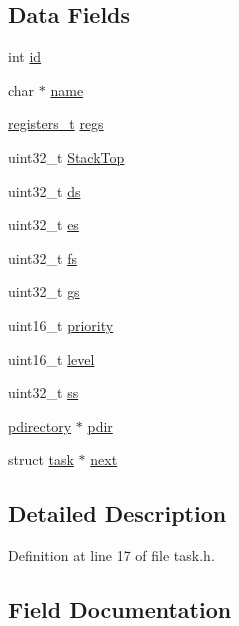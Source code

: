 \subsection*{Data Fields}
\begin{DoxyCompactItemize}
\item 
int \hyperlink{structtask_a22d3a20ff225043177b269ec1a0a5f1a}{id}
\item 
char $\ast$ \hyperlink{structtask_a9aef5dbd16cfbbdb0c8b13416549a07f}{name}
\item 
\hyperlink{common_8h_adf58dbaf6139b4957c348711f2026957}{registers\+\_\+t} \hyperlink{structtask_a682bd33719ea3bc948375a5c51e91e4b}{regs}
\item 
uint32\+\_\+t \hyperlink{structtask_a9a1171f8e45d2c08d5a70290b94c5a6f}{Stack\+Top}
\item 
uint32\+\_\+t \hyperlink{structtask_aa7479c4cde3fed5f6c19fbc857112310}{ds}
\item 
uint32\+\_\+t \hyperlink{structtask_a95a59f8605e8bda30d38f73b67af42cc}{es}
\item 
uint32\+\_\+t \hyperlink{structtask_a2cb171a9e5b5d739cad8b83dffd05be3}{fs}
\item 
uint32\+\_\+t \hyperlink{structtask_a711674cead4b90d23503f3dfba0a489e}{gs}
\item 
uint16\+\_\+t \hyperlink{structtask_ac62cef90688fbf752e32cebb122f178a}{priority}
\item 
uint16\+\_\+t \hyperlink{structtask_a533c24b91bc1238517c1c42b53b3b8f0}{level}
\item 
uint32\+\_\+t \hyperlink{structtask_a9acefcf2fef4e255ec63a180f8ba6aea}{ss}
\item 
\hyperlink{paging_8h_a681a136bf0b5fcccb0c77e91ad5ad7b9}{pdirectory} $\ast$ \hyperlink{structtask_a9c01e75ea4d3ddf248a78c9d70f50237}{pdir}
\item 
struct \hyperlink{structtask}{task} $\ast$ \hyperlink{structtask_a3f2c7149983c28824baf1aebdfa7af98}{next}
\end{DoxyCompactItemize}


\subsection{Detailed Description}


Definition at line 17 of file task.\+h.



\subsection{Field Documentation}
